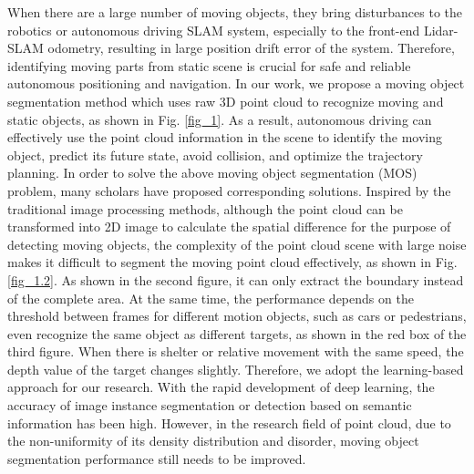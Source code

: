 \documentclass[lettersize,journal]{IEEEtran}
\begin{document}
When there are a large number of moving objects, they bring disturbances to the robotics or autonomous driving SLAM system, especially to the front-end Lidar-SLAM odometry, resulting in large position drift error of the system. Therefore, identifying moving parts from static scene is crucial for safe and reliable autonomous positioning and navigation. In our work, we propose a moving object segmentation method which uses raw 3D point cloud to recognize moving and static objects, as shown in Fig. \ref{fig_1}. As a result, autonomous driving can effectively use the point cloud information in the scene to identify the moving object, predict its future state, avoid collision, and optimize the trajectory planning. In order to solve the above moving object segmentation (MOS) problem, many scholars have proposed corresponding solutions. Inspired by the traditional image processing methods, although the point cloud can be transformed into 2D image to calculate the spatial difference for the purpose of detecting moving objects, the complexity of the point cloud scene with large noise makes it difficult to segment the moving point cloud effectively, as shown in Fig. \ref{fig_1.2}. As shown in the second figure, it can only extract the boundary instead of the complete area. At the same time, the performance depends on the threshold between frames for different motion objects, such as cars or pedestrians, even recognize the same object as different targets, as shown in the red box of the third figure. When there is shelter or relative movement with the same speed, the depth value of the target changes slightly. Therefore, we adopt the learning-based approach for our research. With the rapid development of deep learning, the accuracy of image instance segmentation or detection based on semantic information has been high. However, in the research field of point cloud, due to the non-uniformity of its density distribution and disorder, moving object segmentation performance still needs to be improved.

\end{document}
